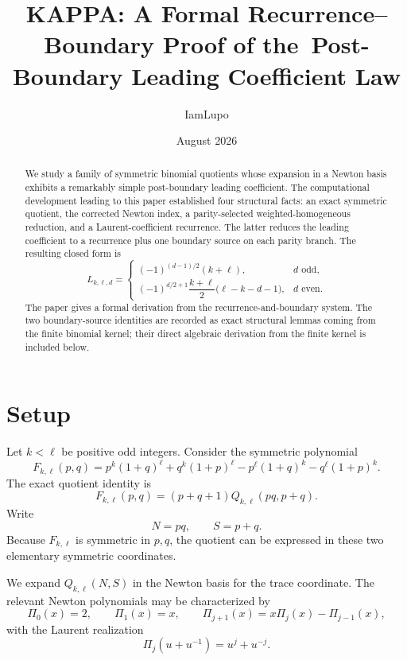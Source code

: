 \documentclass[11pt]{article}
\title{KAPPA: A Formal Recurrence--Boundary Proof of the\
Post-Boundary Leading Coefficient Law}
\author{IamLupo}
\date{August 2026}
\theoremstyle{remark}
\theoremstyle{definition}
\newcommand{\N}{N}
\newcommand{\Ssym}{S}
\newcommand{\Qkl}{Q_{k,\ell}}
\newcommand{\Fkl}{F_{k,\ell}}
\newcommand{\Lkl}{L_{k,\ell,d}}
\begin{document}
\maketitle

\begin{abstract}
We study a family of symmetric binomial quotients whose expansion in a
Newton basis exhibits a remarkably simple post-boundary leading coefficient.
The computational development leading to this paper established four
structural facts: an exact symmetric quotient, the corrected Newton index,
a parity-selected weighted-homogeneous reduction, and a Laurent-coefficient
recurrence.  The latter reduces the leading coefficient to a recurrence plus
one boundary source on each parity branch.  The resulting closed form is
\[
\Lkl=
\begin{cases}
(-1)^{(d-1)/2}(k+\ell), & d\text{ odd},\\[4pt]
(-1)^{d/2+1}\dfrac{k+\ell}{2}\bigl(\ell-k-d-1\bigr),
& d\text{ even}.
\end{cases}
\]
The paper gives a formal derivation from the recurrence-and-boundary system.
The two boundary-source identities are recorded as exact structural lemmas
coming from the finite binomial kernel; their direct algebraic derivation from the finite kernel is included below.
\end{abstract}

\section{Setup}

Let $k<\ell$ be positive odd integers.  Consider the symmetric polynomial
\begin{equation}
\Fkl(p,q)
=
 p^k(1+q)^\ell+q^k(1+p)^\ell
-p^\ell(1+q)^k-q^\ell(1+p)^k.
\label{eq:F}
\end{equation}
The exact quotient identity is
\begin{equation}
\Fkl(p,q)=(p+q+1)\Qkl(pq,p+q).
\label{eq:quotient}
\end{equation}
Write
\[
\N=pq,\qquad \Ssym=p+q.
\]
Because $\Fkl$ is symmetric in $p,q$, the quotient can be expressed in these two elementary symmetric coordinates.

We expand $\Qkl(\N,\Ssym)$ in the Newton basis for the trace coordinate.  The relevant Newton polynomials may be characterized by
\begin{equation}
\Pi_0(x)=2,\qquad \Pi_1(x)=x,
\qquad
\Pi_{j+1}(x)=x\Pi_j(x)-\Pi_{j-1}(x),
\label{eq:newton}
\end{equation}
with the Laurent realization
\begin{equation}
\Pi_j(u+u^{-1})=u^j+u^{-j}.
\label{eq:laurentbasis}
\end{equation}
\end{document}

